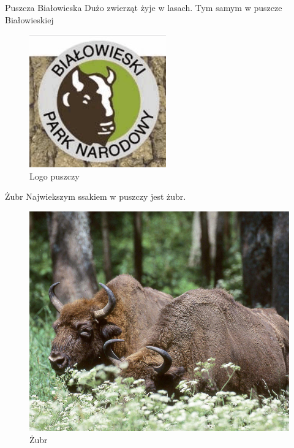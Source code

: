 \documentclass[hyperref={colorlinks = true,linkcolor = black}]{beamer}
\begin{document}
\begin{frame}{Puszcza Białowieska}
Dużo zwierząt żyje w lasach. Tym samym w puszcze Białowieskiej

\begin{figure}[h]
\includegraphics{puszcza.png}
\caption{Logo puszczy}
\label{fig:obr7}
\end{figure}
\end{frame}

\begin{frame}{Żubr}
Najwiekszym ssakiem w puszczy jest żubr. 
\begin{figure}[h]
\includegraphics[scale=0.5]{zubr.png}
\caption{Żubr}
\label{fig:obr8}
\end{figure}
\end{frame}
\end{document}
